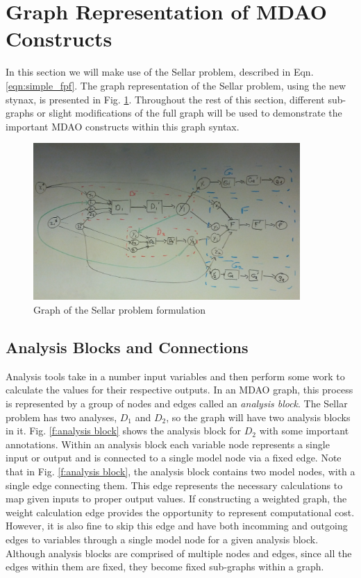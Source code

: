 \section{Graph Representation of MDAO Constructs}
In this section we will make use of the Sellar problem, described in 
Eqn. \ref{eqn:simple_fpf}. The graph representation of the Sellar problem, 
using the new stynax, is presented in Fig. \ref{f:sellar_graph_full}. Throughout
the rest of this section, different sub-graphs or slight modifications of 
the full graph will be used to demonstrate the important MDAO constructs within
this graph syntax.

\begin{figure}[htb!]
    \begin{center}
    \includegraphics[width=4in]{images/sellar_graph_full}
    \end{center}
    \vspace{-10pt}
\caption{Graph of the Sellar problem formulation}
\label{f:sellar_graph_full}
\end{figure}

\subsection{Analysis Blocks and Connections}
Analysis tools take in a number input variables and then perform some work to calculate 
the values for their respective outputs. In an MDAO graph, this process is 
represented by a group of nodes and edges called an \emph{analysis block}. 
The Sellar problem has two analyses, $D_1$ and $D_2$, so the graph will have 
two analysis blocks in it. Fig. \ref{f:analysis block} shows the analysis block for $D_2$
with some important annotations. Within an analysis block each variable 
node represents a single input or output and is connected 
to a single model node via a fixed edge.  Note that in Fig. \ref{f:analysis block}, 
the analysis block contains two model nodes, with a single edge connecting them. 
This edge represents the necessary calculations to map given inputs 
to proper output values. If constructing a weighted graph, the weight calculation edge 
provides the opportunity to represent computational cost. However, it is also fine to skip 
this edge and have both incomming and outgoing edges to variables through a single model 
node for a given analysis block. Although analysis blocks are comprised of multiple nodes and edges, since all 
the edges within them are fixed, they become fixed sub-graphs within a graph.

